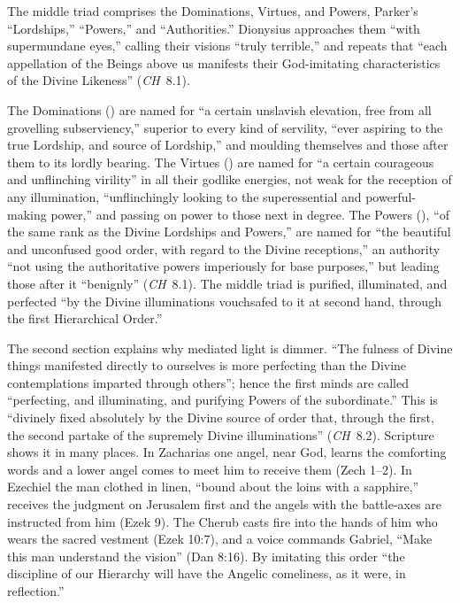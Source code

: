 The middle triad comprises the Dominations, Virtues, and Powers,
Parker's ``Lordships,'' ``Powers,'' and ``Authorities.'' Dionysius
approaches them ``with supermundane eyes,'' calling their visions ``truly
terrible,'' and repeats that ``each appellation of the Beings above us
manifests their God-imitating characteristics of the Divine Likeness''
(\emph{CH}~8.1).

The Dominations () are named for ``a certain unslavish
elevation, free from all grovelling subserviency,'' superior to every
kind of servility, ``ever aspiring to the true Lordship, and source of
Lordship,'' and moulding themselves and those after them to its lordly
bearing. The Virtues () are named for ``a certain
courageous and unflinching virility'' in all their godlike energies, not
weak for the reception of any illumination, ``unflinchingly looking to
the superessential and powerful-making power,'' and passing on power to
those next in degree. The Powers (), ``of the same rank as
the Divine Lordships and Powers,'' are named for ``the beautiful and
unconfused good order, with regard to the Divine receptions,'' an
authority ``not using the authoritative powers imperiously for base
purposes,'' but leading those after it ``benignly'' (\emph{CH}~8.1). The
middle triad is purified, illuminated, and perfected ``by the Divine
illuminations vouchsafed to it at second hand, through the first
Hierarchical Order.''

The second section explains why mediated light is dimmer. ``The fulness
of Divine things manifested directly to ourselves is more perfecting
than the Divine contemplations imparted through others''; hence the first
minds are called ``perfecting, and illuminating, and purifying Powers of
the subordinate.'' This is ``divinely fixed absolutely by the Divine
source of order that, through the first, the second partake of the
supremely Divine illuminations'' (\emph{CH}~8.2). Scripture shows it in
many places. In Zacharias one angel, near God, learns the comforting
words and a lower angel comes to meet him to receive them (Zech 1--2).
In Ezechiel the man clothed in linen, ``bound about the loins with a
sapphire,'' receives the judgment on Jerusalem first and the angels with
the battle-axes are instructed from him (Ezek 9). The Cherub casts fire
into the hands of him who wears the sacred vestment (Ezek 10:7), and a
voice commands Gabriel, ``Make this man understand the vision'' (Dan
8:16). By imitating this order ``the discipline of our Hierarchy will
have the Angelic comeliness, as it were, in reflection.''

